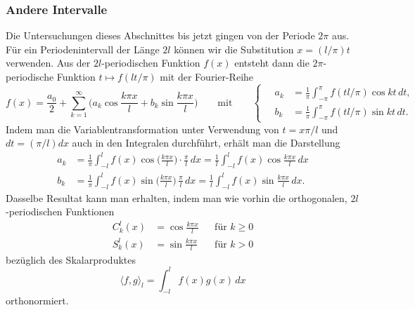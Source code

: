 %
%
\subsubsection{Andere Intervalle}
Die Untersuchungen dieses Abschnittes bis jetzt gingen von der 
Periode $2\pi$ aus.
Für ein Periodenintervall der Länge $2l$ können wir die Substitution
$x=(l/\pi)t$ verwenden.
Aus der $2l$-periodischen Funktion $f(x)$ entsteht dann die $2\pi$-periodische
Funktion $t\mapsto f(lt/\pi)$ mit der Fourier-Reihe
\[
f(x)
=
\frac{a_0}{2}
+
\sum_{k=1}^\infty
\biggl(a_k\cos\frac{k\pi x}{l} + b_k\sin\frac{k\pi x}{l}\biggr)
\qquad\text{mit}\qquad
\left\{\quad
\begin{aligned}
a_k
&=
\frac{1}{\pi}
\int_{-\pi}^\pi f(tl/\pi)\cos kt\,dt,
\\
b_k
&=
\frac{1}{\pi}
\int_{-\pi}^\pi f(tl/\pi)\sin kt\,dt.
\end{aligned}
\right.
\]
Indem man die Variablentransformation unter Verwendung von
$t=x\pi/l$ und $dt = (\pi/l)dx$ auch in den Integralen durchführt,
erhält man die Darstellung
\begin{align*}
a_k
&=
\frac{1}{\pi}\int_{-l}^l f(x)\cos\biggl(\frac{k\pi x}l\biggr)\cdot\frac{\pi}{l}\,dx
=
\frac{1}{l}\int_{-l}^l f(x) \cos\frac{k\pi x}{l} \,dx
\\
b_k
&=
\frac{1}{\pi}\int_{-l}^l f(x)\sin\biggl(\frac{k\pi x}l\biggr)\,\frac{\pi}{l}\,dx
=
\frac{1}{l}\int_{-l}^l f(x) \sin\frac{k\pi x}{l} \,dx.
\end{align*}
Dasselbe Resultat kann man erhalten, indem man wie vorhin die
orthogonalen, $2l$-periodischen Funktionen
\[
\begin{aligned}
C^{l}_k(x) &= \cos\frac{k\pi x}{l} &&\text{für $k\ge 0$}
\\
S^{l}_k(x) &= \sin\frac{k\pi x}{l} &&\text{für $k>0$}
\end{aligned}
\]
bezüglich des Skalarproduktes
\[
\langle f,g\rangle_l
=
\int_{-l}^l f(x)g(x)\,dx
\]
orthonormiert.

%
%
